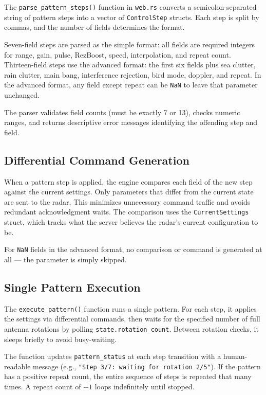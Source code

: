 \documentclass[11pt,letterpaper]{article}
\begin{document}
The \texttt{parse\_pattern\_steps()} function in \texttt{web.rs} converts a semicolon-separated string of pattern steps into a vector of \texttt{ControlStep} structs. Each step is split by commas, and the number of fields determines the format.

Seven-field steps are parsed as the simple format: all fields are required integers for range, gain, pulse, RezBoost, speed, interpolation, and repeat count. Thirteen-field steps use the advanced format: the first six fields plus sea clutter, rain clutter, main bang, interference rejection, bird mode, doppler, and repeat. In the advanced format, any field except repeat can be \texttt{NaN} to leave that parameter unchanged.

The parser validates field counts (must be exactly 7 or 13), checks numeric ranges, and returns descriptive error messages identifying the offending step and field.

\subsection{Differential Command Generation}
\label{subsec:pattern-diff-commands}

When a pattern step is applied, the engine compares each field of the new step against the current settings. Only parameters that differ from the current state are sent to the radar. This minimizes unnecessary command traffic and avoids redundant acknowledgment waits. The comparison uses the \texttt{CurrentSettings} struct, which tracks what the server believes the radar's current configuration to be.

For \texttt{NaN} fields in the advanced format, no comparison or command is generated at all --- the parameter is simply skipped.

\subsection{Single Pattern Execution}
\label{subsec:pattern-single}

The \texttt{execute\_pattern()} function runs a single pattern. For each step, it applies the settings via differential commands, then waits for the specified number of full antenna rotations by polling \texttt{state.rotation\_count}. Between rotation checks, it sleeps briefly to avoid busy-waiting.

The function updates \texttt{pattern\_status} at each step transition with a human-readable message (e.g., \texttt{"Step 3/7: waiting for rotation 2/5"}). If the pattern has a positive repeat count, the entire sequence of steps is repeated that many times. A repeat count of $-1$ loops indefinitely until stopped.
\end{document}
